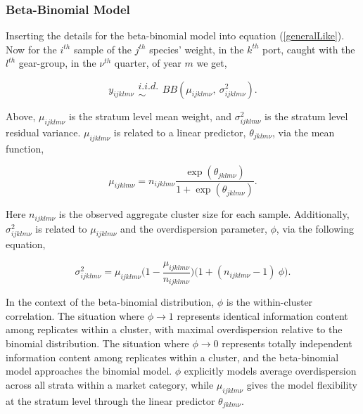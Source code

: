 \documentclass[12pt]{article}
\begin{document}
\subsubsection{Beta-Binomial Model}\label{bbModel}

%
Inserting the details for the beta-binomial model into equation 
(\ref{generalLike}). Now for the \(i^{th}\) sample of the \(j^{th}\) species' 
weight, in the \(k^{th}\) port, caught with the \(l^{th}\) gear-group, in the 
\(\nu^{th}\) quarter, of year \(m\) we get,

\begin{equation}
y_{ijklm\nu} \substack{i.i.d.\\\sim} BB(\mu_{ijklm\nu},~\sigma^2_{ijklm\nu}).
\end{equation}

Above, \(\mu_{ijklm\nu}\) is the stratum level mean weight, and 
\(\sigma^2_{ijklm\nu}\) is the stratum level residual variance.
\(\mu_{ijklm\nu}\) is related to a linear predictor,
\(\theta_{jklm\nu}\), via the mean function,

\begin{equation}
\mu_{ijklm\nu} = n_{ijklm\nu}\frac{\exp(\theta_{jklm\nu})}{1+\exp(\theta_{jklm\nu})}.
\end{equation}

Here \(n_{ijklm\nu}\) is the observed aggregate cluster size for each
sample. Additionally, \(\sigma^2_{ijklm\nu}\) is related to \(\mu_{ijklm\nu}\) 
and the overdispersion parameter, \(\phi\), via the following equation,

\begin{equation}
\sigma^2_{ijklm\nu} = \mu_{ijklm\nu}\Big(1-\frac{\mu_{ijklm\nu}}{n_{ijklm\nu}}\Big)\Big(1+(n_{ijklm\nu}-1)~\phi\Big).
\end{equation}

In the context of the beta-binomial distribution, \(\phi\) is the 
within-cluster correlation. The situation where \(\phi\rightarrow1\) 
represents identical information content among replicates within a cluster, 
with maximal overdispersion relative to the binomial distribution. The 
situation where \(\phi\rightarrow0\) represents totally independent information 
content among replicates within a cluster, and the beta-binomial model 
approaches the binomial model. \(\phi\) explicitly models average 
overdispersion across all strata within a market category, while 
\(\mu_{ijklm\nu}\) gives the model flexibility at the stratum level through the 
linear predictor \(\theta_{jklm\nu}\). 
\end{document}
